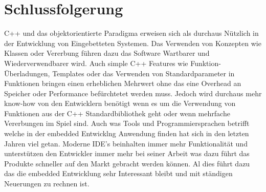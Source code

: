 \documentclass[MES,Master,ngerman]{twbook}%
\begin{document}
\newpage

\chapter{Schlussfolgerung}
C++ und das objektorientierte Paradigma erweisen sich als durchaus Nützlich in der Entwicklung von Eingebetteten Systemen. Das Verwenden von Konzepten wie Klassen oder Vererbung führen dazu das Software Wartbarer und Wiederverwendbarer wird. Auch simple C++ Features wie Funktion- Überladungen, Templates oder das Verwenden von Standardparameter in Funktionen bringen einen erheblichen Mehrwert ohne das eine Overhead an Speicher oder Performance befürchtetet werden muss. Jedoch wird durchaus mehr know-how von den Entwicklern benötigt wenn es um die Verwendung von Funktionen aus der C++ Standardbibliothek geht oder wenn mehrfache Vererbungen im Spiel sind. Auch was Tools und Programmiersprachen betrifft welche in der embedded Entwicklng Anwendung finden hat sich in den letzten Jahren viel getan. Moderne IDE's beinhalten immer mehr Funktionalität und unterstützen den Entwickler immer mehr bei seiner Arbeit was dazu führt das Produkte schneller auf den Markt gebracht werden können. Al dies führt dazu das die embedded Entwicklung sehr Interessant bleibt und mit ständigen Neuerungen zu rechnen ist.
\end{document}

